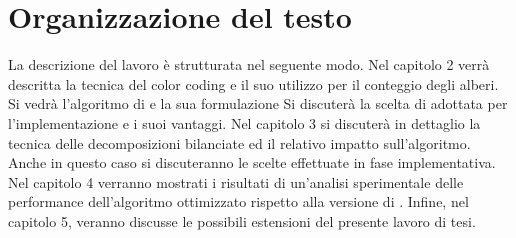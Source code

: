 \section{Organizzazione del testo}

La descrizione del lavoro \`e strutturata nel seguente modo.
Nel capitolo 2 verr\`a descritta la tecnica del color coding e il suo utilizzo per il conteggio degli alberi.
Si vedr\`a l'algoritmo di \cite{bressan2018motif} e la sua formulazione Si discuter\`a la scelta di adottata per l'implementazione e i suoi vantaggi.
Nel capitolo 3 si discuter\`a in dettaglio la tecnica delle decomposizioni bilanciate ed il relativo impatto sull'algoritmo. Anche in questo caso si discuteranno le scelte effettuate in fase implementativa.
Nel capitolo 4 verranno mostrati i risultati di un'analisi sperimentale delle performance dell'algoritmo ottimizzato rispetto alla versione di \cite{bressan2018motif}.
Infine, nel capitolo 5, veranno discusse le possibili estensioni del presente lavoro di tesi.
